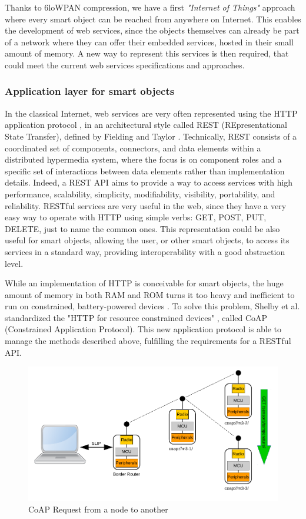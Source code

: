 Thanks to 6loWPAN compression, we have a first \textit{"Internet of Things"} approach where every smart object can be reached from anywhere on Internet.
This enables the development of web services, since the objects themselves can already be part of a network where they can offer their embedded services, hosted in their small amount of memory.
A new way to represent this services is then required, that could meet the current web services specifications and approaches.

\subsubsection{Application layer for smart objects}
In the classical Internet, web services are very often represented using the HTTP application protocol \cite{rfc2616}, in an architectural style called REST (REpresentational State Transfer), defined by Fielding and Taylor \cite{Fielding02REST}.
Technically, REST consists of a coordinated set of components, connectors, and data elements within a distributed hypermedia system, where the focus is on component roles and a specific set of interactions between data elements rather than implementation details.
Indeed, a REST API aims to provide a way to access services with high performance, scalability, simplicity, modifiability, visibility, portability, and reliability.
RESTful services are very useful in the web, since they have a very easy way to operate with HTTP using simple verbs: GET, POST, PUT, DELETE, just to name the common ones.
This representation could be also useful for smart objects, allowing the user, or other smart objects, to access its services in a standard way, providing interoperability with a good abstraction level.

While an implementation of HTTP is conceivable for smart objects, the huge amount of memory in both RAM and ROM turns it too heavy and inefficient to run on constrained, battery-powered devices \cite{Shelby10EWS}.
To solve this problem, Shelby et al. standardized the "HTTP for resource constrained devices" \cite{rfc7252}, called CoAP (Constrained Application Protocol).
This new application protocol is able to manage the methods described above, fulfilling the requirements for a RESTful API.

\begin{figure}[htb]
	\centering
	\includegraphics[width=1\columnwidth]{chapters/background.images/CoAPRequest.pdf}
	\caption{CoAP Request from a node to another}
	\label{fig:CoAPRequest}
\end{figure}

